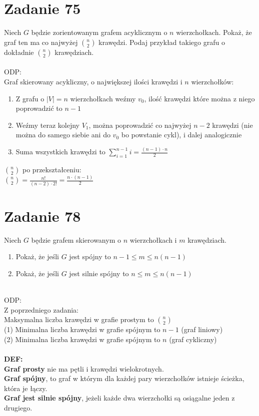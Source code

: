 \documentclass{article}
\begin{document}
\section{\centering Zadanie 75}
Niech $G$ będzie zorientowanym grafem acyklicznym o $n$ wierzchołkach. Pokaż, że graf ten ma co najwyżej $\binom{n}{2}$ krawędzi. Podaj przykład takiego grafu o dokładnie $\binom{n}{2}$ krawędziach.\\\\
ODP: \\
Graf skierowany acykliczny, o największej ilości krawędzi i $n$ wierzchołków:
\begin{enumerate}
	\item Z grafu o $|V| = n$ wierzchołkach weźmy $v_{0}$, ilość krawędzi które można z niego poprowadzić to $n-1$
	\item Weźmy teraz kolejny $V_{1}$, można poprowadzić co najwyżej $n-2$ krawędzi (nie można do samego siebie ani do $v_{0}$ bo powstanie cykl), i dalej analogicznie
	\item Suma wszystkich krawędzi to $\sum_{i=1}^{n-1}i=\frac{(n-1) \cdot n}{2}$
\end{enumerate}
$\binom{n}{2}$ po przekształceniu:\\
$\binom{n}{2} = \frac{n!}{(n-2) \cdot 2!} = \frac{n \cdot (n-1)}{2}$
\section{\centering Zadanie 78}
Niech $G$ będzie grafem skierowanym o $n$ wierzchołkach i $m$ krawędziach.
\begin{enumerate}
	\item Pokaż, że jeśli $G$ jest spójny to $n-1\leq m \leq n(n-1)$
	\item Pokaż, że jeśli $G$ jest silnie spójny to $n\leq m \leq n(n-1)$\\\\
\end{enumerate}
ODP: \\
Z poprzedniego zadania: \\
Maksymalna liczba krawędzi w grafie prostym to $\binom{n}{2}$\\
(1) Minimalna liczba krawędzi w grafie spójnym to $n-1$ (graf liniowy)\\
(2) Minimalna liczba krawędzi w grafie spójnym to $n$ (graf cykliczny)\\\\

\noindent \textbf{DEF:}\\
\textbf{Graf prosty} nie ma pętli i krawędzi wielokrotnych.\\
\textbf{Graf spójny}, to graf w którym dla każdej pary wierzchołków istnieje ścieżka, która je łączy.\\
\textbf{Graf jest silnie spójny}, jeżeli każde dwa wierzchołki są osiągalne jeden z drugiego.
\end{document}
